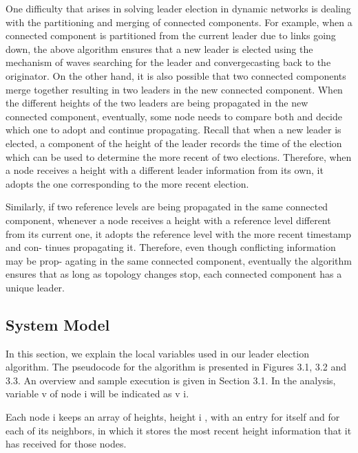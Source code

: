 \documentclass{article}
\begin{document}
One difficulty that arises in solving leader election in dynamic networks is dealing
with the partitioning and merging of connected components. For example, when a
connected component is partitioned from the current leader due to links going down,
the above algorithm ensures that a new leader is elected using the mechanism of
waves searching for the leader and convergecasting back to the originator. On the
other hand, it is also possible that two connected components merge together resulting
in two leaders in the new connected component. When the different heights of the two
leaders are being propagated in the new connected component, eventually, some node
needs to compare both and decide which one to adopt and continue propagating.
Recall that when a new leader is elected, a component of the height of the leader
records the time of the election which can be used to determine the more recent
of two elections. Therefore, when a node receives a height with a different leader
information from its own, it adopts the one corresponding to the more recent election.

Similarly, if two reference levels are being propagated in the same connected
component, whenever a node receives a height with a reference level different from
its current one, it adopts the reference level with the more recent timestamp and con-
tinues propagating it. Therefore, even though conflicting information may be prop-
agating in the same connected component, eventually the algorithm ensures that as
long as topology changes stop, each connected component has a unique leader.

\subsection{System Model}
In this section, we explain the local variables used in our leader election algorithm. The pseudocode for the algorithm is presented in Figures 3.1, 3.2 and 3.3. An overview and sample execution is given in Section 3.1. In the analysis, variable v of node i will be indicated as v i.

Each node i keeps an array of heights, height i , with an entry for itself and for each of its neighbors, in which it stores the most recent height information that it has received for those nodes.
\end{document}
